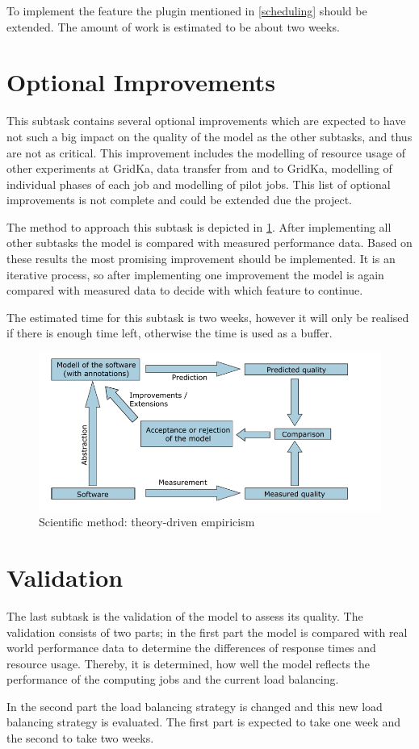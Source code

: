 To implement the feature the plugin mentioned in \cref{scheduling} should be extended. The amount of work is estimated to be about two weeks.

\section{Optional Improvements}
This subtask contains several optional improvements which are expected to have not such a big impact on the quality of the model as the other subtasks, and thus are not as critical. This improvement includes the modelling of resource usage of other experiments at GridKa, data transfer from and to GridKa, modelling of individual phases of each job and modelling of pilot jobs.
This list of optional improvements is not complete and could be extended due the project.

The method to approach this subtask is depicted in \cref{iterative}. After implementing all other subtasks the model is compared with measured performance data. Based on these results the most promising improvement should be implemented. It is an iterative process, so after implementing one improvement the model is again compared with measured data to decide with which feature to continue.

The estimated time for this subtask is two weeks, however it will only be realised if there is enough time left, otherwise the time is used as a buffer.

\begin{figure}[h]
	\centering
	\includegraphics[width=1.0\linewidth]{images/method}
	\caption[]{Scientific method: theory-driven empiricism \cite{theory}}
	\label{iterative}
\end{figure}


\section{Validation}

The last subtask is the validation of the model to assess its quality. The validation consists of two parts; in the first part the model is compared with real world performance data to determine the differences of response times and resource usage.
Thereby, it is determined, how well the model reflects the performance of the computing jobs and the current load balancing.

In the second part the load balancing strategy is changed and this new load balancing strategy is evaluated.
The first part is expected to take one week and the second to take two weeks.
